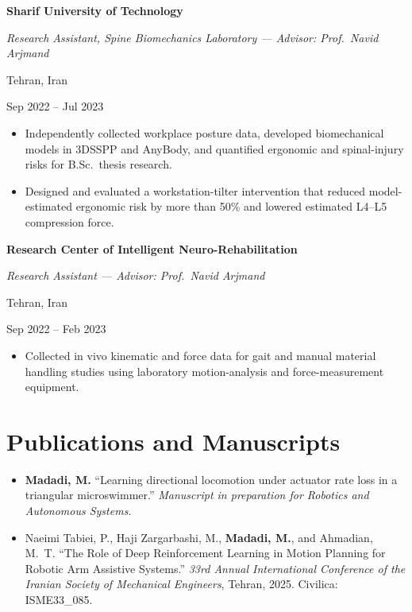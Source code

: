 \documentclass[10pt,letterpaper]{article}
\newcommand{\cvhead}[4]{%
  \par\vspace{3.5pt}%
  \noindent
  \begin{minipage}[t]{0.75\textwidth}
    \textbf{#1}\par
    \textit{#2}%
  \end{minipage}%
  \hfill
  \begin{minipage}[t]{0.23\textwidth}
    \raggedleft #3\par
    \raggedleft #4%
  \end{minipage}\par
  \vspace{1pt}%
}
\begin{document}
\cvhead{Sharif University of Technology}{Research Assistant, Spine Biomechanics Laboratory --- Advisor: Prof.\ Navid Arjmand}{Tehran, Iran}{Sep 2022 -- Jul 2023}
\begin{itemize}
  \item Independently collected workplace posture data, developed biomechanical models in 3DSSPP and AnyBody, and quantified ergonomic and spinal-injury risks for B.Sc.\ thesis research.
  \item Designed and evaluated a workstation-tilter intervention that reduced model-estimated ergonomic risk by more than 50\% and lowered estimated L4--L5 compression force.
\end{itemize}

\cvhead{Research Center of Intelligent Neuro-Rehabilitation}{Research Assistant --- Advisor: Prof.\ Navid Arjmand}{Tehran, Iran}{Sep 2022 -- Feb 2023}
\begin{itemize}
  \item Collected in vivo kinematic and force data for gait and manual material handling studies using laboratory motion-analysis and force-measurement equipment.
\end{itemize}

\section{Publications and Manuscripts}
\begin{itemize}
  \item \textbf{Madadi, M.} ``Learning directional locomotion under actuator rate loss in a triangular microswimmer.'' \textit{Manuscript in preparation for Robotics and Autonomous Systems.}
  \item Naeimi Tabiei, P., Haji Zargarbashi, M., \textbf{Madadi, M.}, and Ahmadian, M.\ T. ``The Role of Deep Reinforcement Learning in Motion Planning for Robotic Arm Assistive Systems.'' \textit{33rd Annual International Conference of the Iranian Society of Mechanical Engineers}, Tehran, 2025. Civilica: ISME33\_085.
\end{itemize}
\end{document}
